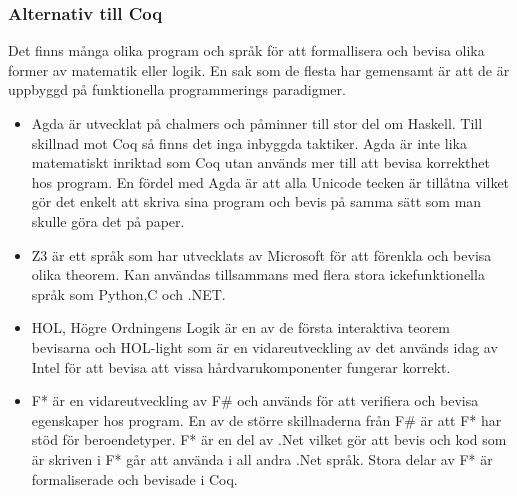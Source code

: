 \subsubsection{Alternativ till Coq}
Det finns många olika program och språk för att formallisera och bevisa olika
former av matematik eller logik. En sak som de flesta har gemensamt är att de
är uppbyggd på funktionella programmerings paradigmer.

\begin{itemize}
\item Agda är utvecklat på chalmers och påminner till stor del om Haskell. Till
skillnad mot Coq så finns det inga inbyggda taktiker.  Agda är inte lika
matematiskt inriktad som Coq utan används mer till att bevisa korrekthet hos
program. En fördel med Agda är att alla Unicode tecken är tillåtna vilket gör
det enkelt att skriva sina program och bevis på samma sätt som man skulle göra
det på paper.

\item Z3 är ett språk som har utvecklats av Microsoft för att förenkla och bevisa
olika theorem. Kan användas tillsammans med flera stora ickefunktionella språk
som Python,C och .NET.

\item HOL, Högre Ordningens Logik är en av de första interaktiva teorem bevisarna och
HOL-light som är en vidareutveckling av det används idag av Intel för att
bevisa att vissa hårdvarukomponenter fungerar korrekt.

\item F* är en vidareutveckling av F\# och används för att verifiera och bevisa
egenskaper hos program. En av de större skillnaderna från F\# är att F* har
stöd för beroendetyper. F* är en del av .Net vilket gör att bevis och kod som
är skriven i F* går att använda i all andra .Net språk. Stora delar av F* är
formaliserade och bevisade i Coq.
\end{itemize}

\begin{comment}
Källor och annat material
HOL http://www.cl.cam.ac.uk/~jrh13/hol-light/
Z3 http://research.microsoft.com/en-us/um/redmond/projects/z3/old/
F* http://research.microsoft.com/en-us/projects/fstar/
\end{comment}

